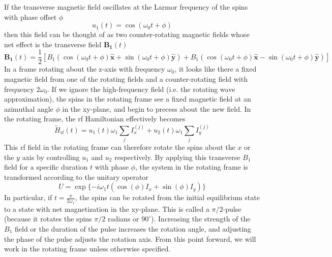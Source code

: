 If the transverse magnetic field oscillates at the Larmor frequency of the spins with phase offset $\phi$
\[
u_1(t) = \cos(\omega_0 t + \phi)
\]
then this field can be thought of as two counter-rotating magnetic fields whose net effect is the transverse field $\mathbf{B_1}(t)$
\[
\mathbf{B_1}(t) = \frac{1}{2} \left[
    B_1 (\cos(\omega_0 t + \phi) \mathbf{\hat{x}} + \sin(\omega_0 t + \phi) \mathbf{\hat{y}}) +
    B_1 (\cos(\omega_0 t + \phi) \mathbf{\hat{x}} - \sin(\omega_0 t + \phi) \mathbf{\hat{y}})
\right]
\]
%
%
In a frame rotating about the z-axis with frequency $\omega_0$, it looks like there a fixed magnetic field from one of the rotating fields and a counter-rotating field with frequency $2\omega_0$. If we ignore the high-frequency field (i.e. the rotating wave approximation), the spins in the rotating frame see a fixed magnetic field at an azimuthal angle $\phi$ in the xy-plane, and begin to precess about the new field.
In the rotating frame, the rf Hamiltonian effectively becomes
\begin{equation}\label{eq:nmr-ham-rf-rotating}
    \widetilde{H}_\text{rf}(t) = u_1(t) \omega_1 \sum_j I_x^{(j)} + u_2(t) \omega_1 \sum_j I_y^{(j)}
\end{equation}
This rf field in the rotating frame can therefore rotate the spins about the $x$ or the $y$ axis by controlling $u_1$ and $u_2$ respectively.
By applying this transverse $B_1$ field for a specific duration $t$ with phase $\phi$, the system in the rotating frame is transformed according to the unitary operator
\[
U = \exp\{-i \omega_1 t (\cos(\phi) I_x + \sin(\phi) I_y)\}
\]
In particular, if $t = \frac{\pi}{2 \omega_1}$, the spins can be rotated from the initial equilibrium state to a state with net magnetization in the xy-plane. This is called a $\pi/2$-pulse (because it rotates the spins $\pi/2$ radians or $90^\circ$). Increasing the strength of the $B_1$ field or the duration of the pulse increases the rotation angle, and adjusting the phase of the pulse adjusts the rotation axis.
From this point forward, we will work in the rotating frame unless otherwise specified.

